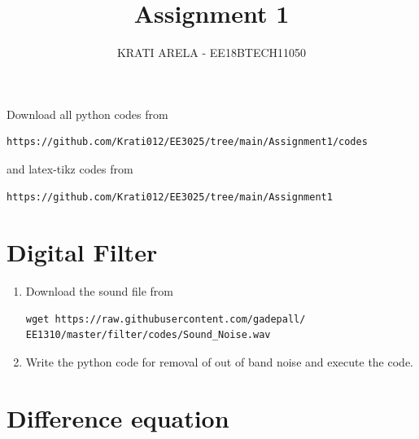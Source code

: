 \documentclass[journal,12pt,twocolumn]{IEEEtran}
\renewcommand\thesection{\arabic{section}}
\begin{document}
\def\putbox#1#2#3{\makebox[0in][l]{\makebox[#1][l]{}\raisebox{\baselineskip}[0in][0in]{\raisebox{#2}[0in][0in]{#3}}}}
     \def\rightbox#1{\makebox[0in][r]{#1}}
     \def\centbox#1{\makebox[0in]{#1}}
     \def\topbox#1{\raisebox{-\baselineskip}[0in][0in]{#1}}
     \def\midbox#1{\raisebox{-0.5\baselineskip}[0in][0in]{#1}}
\vspace{3cm}
\title{Assignment 1}
\author{KRATI ARELA - EE18BTECH11050}
\maketitle
\newpage
\renewcommand{\thefigure}{\theenumi}
\renewcommand{\thetable}{\theenumi}



Download all python codes from 
\begin{lstlisting}
https://github.com/Krati012/EE3025/tree/main/Assignment1/codes
\end{lstlisting}
and latex-tikz codes from 
\begin{lstlisting}
https://github.com/Krati012/EE3025/tree/main/Assignment1
\end{lstlisting}
\section{Digital Filter}
\begin{enumerate}[label=\thesection.\arabic*
,ref=\thesection.\theenumi]
\item
\label{prob:inp}
Download the sound file from  
\begin{lstlisting}
wget https://raw.githubusercontent.com/gadepall/ 
EE1310/master/filter/codes/Sound_Noise.wav
\end{lstlisting}

\item
\label{prob:out}
Write the python code for removal of out of band noise and execute the code.
\\
\solution

\end{enumerate}
\section{Difference equation}
\end{document}
